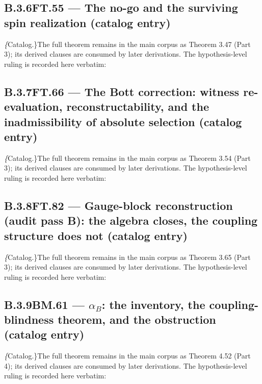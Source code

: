 \documentclass[11pt,openany]{report}
\theoremstyle{canonplain}
\theoremstyle{canondef}
\begin{document}
\medskip
\subsection*{\texorpdfstring{B.3.6\quad FT.55 — The no-go and the surviving spin realization (catalog entry)}{FT.55 B.3.6}}
\label{tag:FT-55-cat}
{\small \textit\{Catalog.\}\quad The full theorem remains in the main corpus as Theorem 3.47 (Part 3); its derived clauses are consumed by later derivations. The hypothesis-level ruling is recorded here verbatim:}
\begin{quote}\small \end{quote}
\medskip
\subsection*{\texorpdfstring{B.3.7\quad FT.66 — The Bott correction: witness re-evaluation, reconstructability, and the inadmissibility of absolute selection (catalog entry)}{FT.66 B.3.7}}
\label{tag:FT-66-cat}
{\small \textit\{Catalog.\}\quad The full theorem remains in the main corpus as Theorem 3.54 (Part 3); its derived clauses are consumed by later derivations. The hypothesis-level ruling is recorded here verbatim:}
\begin{quote}\small \end{quote}
\medskip
\subsection*{\texorpdfstring{B.3.8\quad FT.82 — Gauge-block reconstruction (audit pass B): the algebra closes, the coupling structure does not (catalog entry)}{FT.82 B.3.8}}
\label{tag:FT-82-cat}
{\small \textit\{Catalog.\}\quad The full theorem remains in the main corpus as Theorem 3.65 (Part 3); its derived clauses are consumed by later derivations. The hypothesis-level ruling is recorded here verbatim:}
\begin{quote}\small \end{quote}
\medskip
\subsection*{\texorpdfstring{B.3.9\quad BM.61 — $\alpha_B$: the inventory, the coupling-blindness theorem, and the obstruction (catalog entry)}{BM.61 B.3.9}}
\label{tag:BM-61-cat}
{\small \textit\{Catalog.\}\quad The full theorem remains in the main corpus as Theorem 4.52 (Part 4); its derived clauses are consumed by later derivations. The hypothesis-level ruling is recorded here verbatim:}
\begin{quote}\small \end{quote}
\medskip
\end{document}
